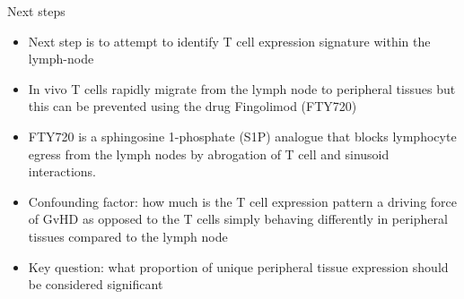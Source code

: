 \documentclass[final,hyperref={pdfpagelabels=false}]{beamer}
\begin{document}
\begin{frame}{}
\begin{columns}[t]
\begin{column}{.40\linewidth}
	\begin{block}{Next steps}
    {\small  \begin{itemize}
            \item Next step is to attempt to identify T cell expression signature within the lymph-node
	    \item In vivo T cells rapidly migrate from the lymph node to peripheral tissues but this can be prevented using the drug Fingolimod (FTY720) 
	     \item FTY720 is a sphingosine 1-phosphate (S1P) analogue that blocks lymphocyte egress from the lymph nodes by abrogation of T cell and sinusoid interactions.
	      \item Confounding factor: how much is the T cell expression pattern a driving force of GvHD as opposed to the T cells simply behaving differently in peripheral tissues compared to the lymph node
	      \item Key question: what proportion of unique peripheral tissue expression should be considered significant 
          \end{itemize}}
    \end{block}

\end{column}

    \end{columns}
  \end{frame}
\end{document}
